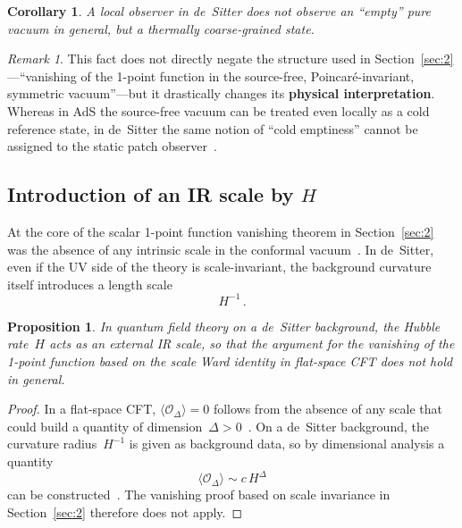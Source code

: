 \documentclass[
  aps,
  prd,
  preprint,
  groupedaddress,
  nofootinbib,
  longbibliography
]{revtex4-2}
\newtheorem{proposition}[definition]{Proposition}
\newtheorem{corollary}[definition]{Corollary}
\theoremstyle{remark}
\newtheorem{remark}[definition]{Remark}
\begin{document}
\begin{corollary}\label{cor:no-cold-vacuum}
A local observer in de~Sitter does not observe an ``empty'' pure
vacuum in general, but a thermally coarse-grained state.
\end{corollary}

\begin{remark}\label{rem:thermal-interpretation}
This fact does not directly negate the structure used in
Section~\ref{sec:2}---``vanishing of the 1-point function in
the source-free, Poincar\'e-invariant, symmetric vacuum''---but
it drastically changes its \textbf{physical interpretation}.
Whereas in AdS the source-free vacuum can be treated even locally
as a cold reference state, in de~Sitter the same notion of
``cold emptiness'' cannot be assigned to the static patch
observer~\cite{ref15,ref16,ref17,ref20,ref21,ref23}.
\end{remark}

\subsection{Introduction of an IR scale by \texorpdfstring{$H$}{H}}%
  \label{subsec:4-3}

At the core of the scalar 1-point function vanishing theorem
in Section~\ref{sec:2} was the absence of any intrinsic scale
in the conformal vacuum~\cite{ref13,ref14}.
In de~Sitter, even if the UV side of the theory is scale-invariant,
the background curvature itself introduces a length
scale~\cite{ref17,ref20,ref21}
\begin{equation}\label{eq:H-scale}
  H^{-1}\,.
\end{equation}

\begin{proposition}\label{prop:IR-scale}
In quantum field theory on a de~Sitter background, the Hubble
rate~$H$ acts as an external IR scale, so that the argument for
the vanishing of the 1-point function based on the scale Ward
identity in flat-space CFT does not hold in general.
\end{proposition}

\begin{proof}
In a flat-space CFT, $\langle\mathcal{O}_\Delta\rangle=0$
follows from the absence of any scale that could build a quantity
of dimension~$\Delta>0$~\cite{ref13,ref14}.
On a de~Sitter background, the curvature
radius~$H^{-1}$ is given as background data, so by dimensional
analysis a quantity
\begin{equation}\label{eq:dim-analysis}
  \langle\mathcal{O}_\Delta\rangle \sim c\,H^\Delta
\end{equation}
can be constructed~\cite{ref17,ref20,ref21}.
The vanishing proof based on scale invariance in
Section~\ref{sec:2} therefore does not apply.
\end{proof}
\end{document}
